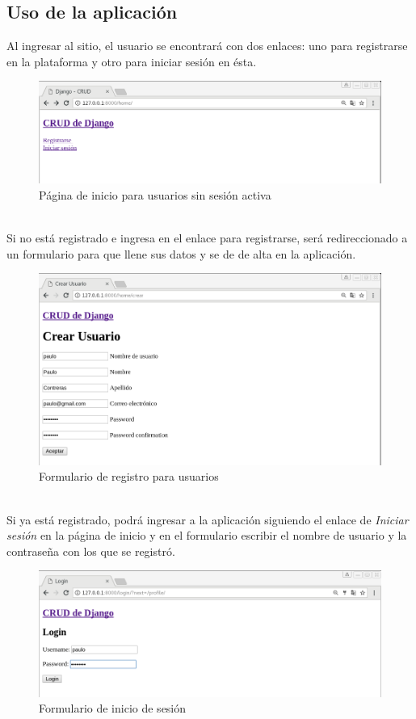 \documentclass[9pt]{article}
\begin{document}
\subsection{Uso de la aplicación}
Al ingresar al sitio, el usuario se encontrará con dos enlaces: uno para registrarse en la plataforma y otro para iniciar sesión en ésta.
\begin{figure}[h!]
  \centering
  \includegraphics[width=\textwidth]{django_crud/home_notlogged}
  \caption{Página de inicio para usuarios sin sesión activa}
\end{figure}
\\
Si no está registrado e ingresa en el enlace para registrarse, será redireccionado a un formulario para que llene sus datos y se de de alta en la aplicación. 
\begin{figure}[h!]
  \centering
  \includegraphics[width=\textwidth]{django_crud/registration}
  \caption{Formulario de registro para usuarios}
\end{figure}
\\
Si ya está registrado, podrá ingresar a la aplicación siguiendo el enlace de \textit{Iniciar sesión} en la página de inicio y en el formulario escribir el nombre de usuario y la contraseña con los que se registró.
\begin{figure}[h!]
  \centering
  \includegraphics[width=\textwidth]{django_crud/login}
  \caption{Formulario de inicio de sesión}
\end{figure}
\\
\end{document}
